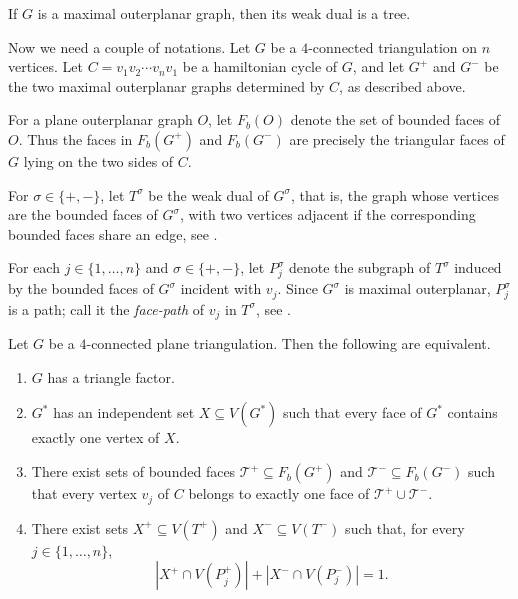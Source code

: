 \documentclass{patmorin}
\newcommand{\defin}[1]{\emph{\textcolor{brightmaroon}{#1}}}
\begin{document}
\begin{obs}
If $G$ is a maximal outerplanar graph, then its weak dual is a tree.
\end{obs}

Now we need a couple of notations.
Let $G$ be a $4$-connected triangulation on $n$ vertices. Let $C=v_1v_2\cdots v_nv_1$ be a hamiltonian cycle of $G$, and let $G^+$ and $G^-$
be the two maximal outerplanar graphs determined by $C$, as described above.

For a plane outerplanar graph $O$, let $F_b(O)$ denote the set of bounded
faces of $O$. Thus the faces in $F_b(G^+)$ and $F_b(G^-)$ are precisely the
triangular faces of $G$ lying on the two sides of $C$.

For $\sigma\in\{+,-\}$, let $T^\sigma$ be the weak dual of $G^\sigma$,
that is, the graph whose vertices are the bounded faces of $G^\sigma$, with
two vertices adjacent if the corresponding bounded faces share an edge, see .

\begin{defn}
For each $j\in\{1,\dots,n\}$ and $\sigma\in\{+,-\}$, let $P_j^\sigma$
denote the subgraph of $T^\sigma$ induced by the bounded faces of
$G^\sigma$ incident with $v_j$. Since $G^\sigma$ is maximal outerplanar, $P_j^\sigma$ is a path; call it the \defin{face-path} of $v_j$ in $T^\sigma$, see .
\end{defn}


\begin{thm}\label{thm:4-conn}
Let $G$ be a $4$-connected plane triangulation.
Then the following are equivalent.

\begin{enumerate}
\item $G$ has a triangle factor.

\item $G^*$ has an independent set
$X\subseteq V(G^*)$ such that every face of $G^*$ contains exactly one vertex
of $X$.

\item There exist sets of bounded faces
$\mathcal T^+\subseteq F_b(G^+)$ and $\mathcal T^-\subseteq F_b(G^-)$ such that
every vertex $v_j$ of $C$ belongs to exactly one face of
$\mathcal T^+\cup\mathcal T^-$.

\item There exist sets $X^+\subseteq V(T^+)$ and $X^-\subseteq V(T^-)$ such
that, for every $j\in\{1,\dots,n\}$,
\[
|X^+\cap V(P_j^+)|+|X^-\cap V(P_j^-)|=1.
\]
\end{enumerate}
\end{thm}
\end{document}
